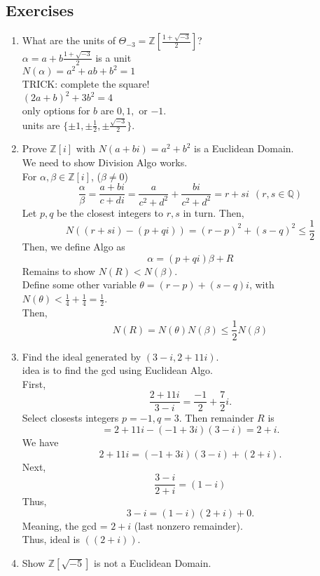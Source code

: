 \documentclass[12pt]{article}
\begin{document}
\subsection*{Exercises}
\begin{enumerate}
    \item What are the units of $\Theta_{-3} = \mathbb{Z}[\frac{1 + \sqrt {-3}}{2}]$?\\
\textcolor[gray]{0.5}{$\alpha = a + b \frac{1 + \sqrt{-3}}{2}$ is a unit 
\iff\\
$N(\alpha) = a^2 + ab + b^2 = 1$ \\
TRICK: complete the square! \\
$(2a + b)^2 + 3b^2 = 4 $\\
only options for $b$ are $0, 1,$ or $-1$.\\
units are $\{\pm 1, \pm \frac{1}{2}, \pm \frac{\sqrt{-3}}{2}\}$.
}
    \item Prove $\mathbb{Z}[i]$ with $N(a+bi) = a^2 + b^2$ is a Euclidean Domain.\\
   \textcolor[gray]{0.5}{We need to show Division Algo works. \\
   For $\alpha, \beta \in \mathbb{Z}[i]$, ($\beta \neq 0$)\\
   $$\frac{\alpha}{\beta} = \frac{a+bi}{c+di} = \frac{a}{c^2+d^2} + \frac{bi}{c^2+d^2} = r + si \ \ (r, s\in \mathbb{Q})$$
   Let $p, q$ be the closest integers to $r,s$ in turn. Then, 
   $$N((r+si)-(p + qi)) = (r-p)^2 + (s-q)^2 \leq \frac{1}{2}$$
   Then, we define Algo as
   $$\alpha = (p + qi) \beta + R$$ 
   Remains to show $N(R) < N(\beta)$.  \\
   Define some other variable $\theta = (r - p) + (s - q)i$, with $N(\theta) < \frac{1}{4} + \frac{1}{4} = \frac{1}{2}$.\\
   Then, 
   $$N(R) = N(\theta)N(\beta) \leq \frac{1}{2} N(\beta)$$
   }
    \item Find the ideal generated by $(3-i, 2 + 11i)$.\\
\textcolor[gray]{0.5}{idea is to find the gcd using Euclidean Algo.\\
First, 
    $$\frac{2 + 11i}{3-i} = \frac{-1}{2} + \frac{7}{2} i.$$
Select closests integers $p = -1, q = 3$. Then remainder $R$ is
$$= 2 + 11i - (-1+3i)(3-i) = 2 + i.$$
We have
$$2 + 11i = (-1 + 3i)(3-i) + (2+i).$$
Next, 
$$\frac{3-i}{2+i} = (1-i) $$
Thus, 
$$3-i = (1-i)(2+i) + 0.$$
Meaning, the gcd = $2+i$ (last nonzero remainder).\\
Thus, ideal is $((2+i))$.
}
    \item Show $\mathbb{Z}[\sqrt{-5}]$ is not a Euclidean Domain.\\

\end{enumerate}
\end{document}
